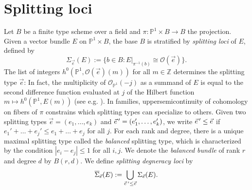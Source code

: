 \documentclass[12pt]{amsart}
\newcommand{\zz}{\mathbb{Z}}
\newcommand{\pp}{\mathbb{P}}
\renewcommand{\O}{\mathscr{O}}
\newcommand{\ee}{{\vec{e}} \nobreak\hspace{.16667em plus .08333em}'}
\newcommand{\e}{\vec{e}}
\theoremstyle{definition}
\theoremstyle{remark}
\theoremstyle{remark}
\numberwithin{equation}{section}
\begin{document}
\section{Splitting loci} \label{split}
Let $B$ be a finite type scheme over a field and $\pi: \pp^1 \times B \rightarrow B$ the projection. 
Given a vector bundle $E$ on $\pp^1 \times B$, the base $B$ is stratified by \textit{splitting loci} of $E$, defined by
\[\Sigma_{\vec{e}}(E) := \{b \in B : E|_{\pi^{-1}(b)} \cong \O(\vec{e})\}.\]
The list of integers $h^0(\pp^1, \O(\vec{e})(m))$ for all $m \in \zz$ determines the splitting type $\vec{e}$: In fact, the multiplicity of $\O_{\pp^1}(-j)$ as a summand of $E$ is equal to the second difference function evaluated at $j$ of the Hilbert function $m \mapsto h^0(\pp^1, E(m))$ (see e.g. \cite[Lemma 5.6]{ES}).
In families, uppersemicontinuity of cohomology on fibers of $\pi$ constrains which splitting types can specialize to others. Given two splitting types $\e = (e_1, \ldots, e_k)$ and $\ee = (e_1', \ldots, e_k')$, we write $\ee \leq \e$ if $e_1'+\ldots + e_j' \leq e_1+\ldots+e_j$ for all $j$. 
For each rank and degree, there is a unique maximal splitting type called the \textit{balanced} splitting type, which is characterized by the condition $|e_i - e_j| \leq 1$ for all $i, j$. We denote the \textit{balanced bundle} of rank $r$ and degree $d$ by $B(r, d)$.
We define \textit{splitting degneracy loci} by
\begin{equation} \label{u}
\overline{\Sigma}_{\vec{e}}(E) := \bigcup_{\ee \leq \e} \Sigma_{\vec{e}}(E).
\end{equation}
\end{document}
